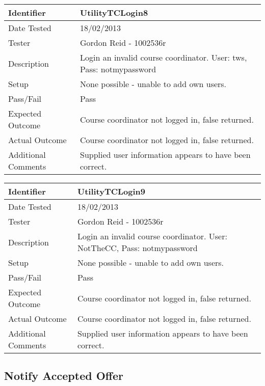 \documentclass[11pt]{l3deliverable}
\begin{document}
\begin{tabularx}{\textwidth}{|T|L|}
\hline
Identifier & UtilityTCLogin8\\
\hline
Date Tested & 18/02/2013\\
\hline
Tester & Gordon Reid - 1002536r\\
\hline
Description & Login an invalid course coordinator. User: tws, Pass: 
notmypassword\\
\hline
Setup & None possible - unable to add own users.\\
\hline
Pass/Fail & Pass\\
\hline
Expected Outcome & Course coordinator not logged in, false returned.\\
\hline
Actual Outcome & Course coordinator not logged in, false returned.\\
\hline
Additional Comments & Supplied user information appears to have been correct.\\
\hline
\end{tabularx}

\vspace{2em}

\begin{tabularx}{\textwidth}{|T|L|}
\hline
Identifier & UtilityTCLogin9\\
\hline
Date Tested & 18/02/2013\\
\hline
Tester & Gordon Reid - 1002536r\\
\hline
Description & Login an invalid course coordinator. User: NotTheCC, Pass: 
notmypassword\\
\hline
Setup & None possible - unable to add own users.\\
\hline
Pass/Fail & Pass\\
\hline
Expected Outcome & Course coordinator not logged in, false returned.\\
\hline
Actual Outcome & Course coordinator not logged in, false returned.\\
\hline
Additional Comments & Supplied user information appears to have been correct.\\
\hline
\end{tabularx}

\newpage

\subsection{Notify Accepted Offer}

\newpage
\end{document}
